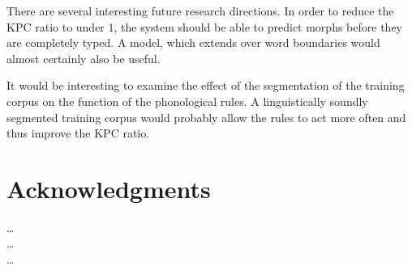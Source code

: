 \documentclass{llncs}
\begin{document}
There are several interesting future research directions. In order to
reduce the KPC ratio to under $1$, the system should be able to
predict morphs before they are completely typed. A model, which
extends over word boundaries would almost certainly also be useful.

It would be interesting to examine the effect of the segmentation of
the training corpus on the function of the phonological rules. A
linguistically soundly segmented training corpus would probably allow
the rules to act more often and thus improve the KPC ratio.

\section{Acknowledgments}
\ldots\\
\ldots\\
\ldots




\end{document}

